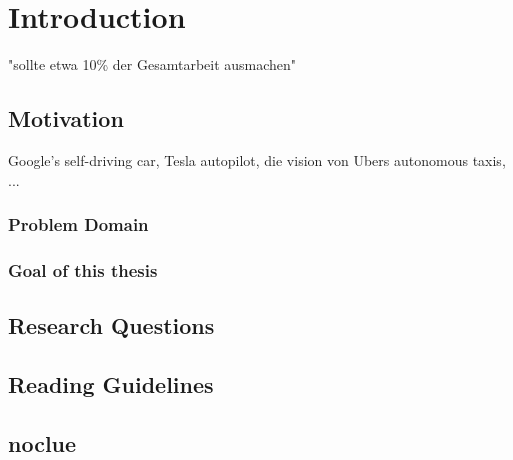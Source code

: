 
\chapter{Introduction} %

\label{ChapterX} %


\newcommand{\keyword}[1]{\textit{#1}}
\newcommand{\tabhead}[1]{\textbf{#1}}
\newcommand{\code}[1]{\texttt{#1}}
\newcommand{\file}[1]{\texttt{\bfseries#1}}
\newcommand{\option}[1]{\texttt{\itshape#1}}
\newcommand{\batchnorm}{batch normalization }
\newcommand{\Batchnorm}{Batch normalization }


"sollte etwa 10\% der Gesamtarbeit ausmachen"

\section{Motivation}

Google's self-driving car, Tesla autopilot, die vision von Ubers autonomous taxis, ...

\subsection{Problem Domain}

\subsection{Goal of this thesis}

\section{Research Questions}

\section{Reading Guidelines}


\section{noclue}

